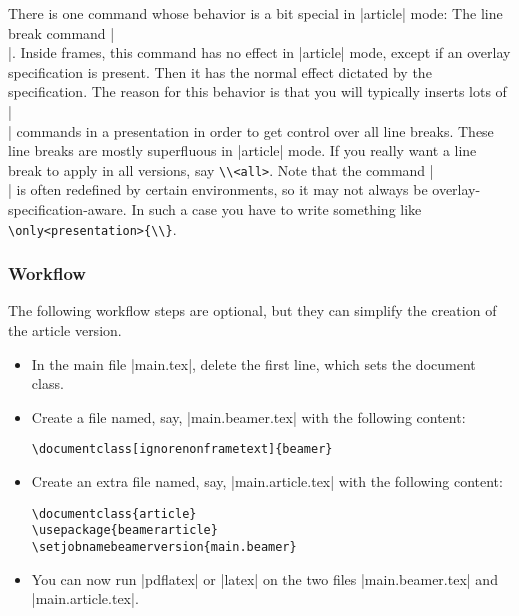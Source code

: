 There is one command whose behavior is a bit special in |article| mode: The line break command |\\|. Inside frames, this command has no effect in |article| mode, except if an overlay specification is present. Then it has the normal effect dictated by the specification. The reason for this behavior is that you will typically inserts lots of |\\| commands in a presentation in order to get control over all line breaks. These line breaks are mostly superfluous in |article| mode. If you really want a line break to apply in all versions, say \Verb|\\<all>|. Note that the command |\\| is often redefined by certain environments, so it may not always be overlay-specification-aware. In such a case you have to write something like \Verb|\only<presentation>{\\}|.

\subsubsection{Workflow}
\label{section-article-version-workflow}

The following workflow steps are optional, but they can simplify the creation of the article version.

\begin{itemize}
\item
  In the main file |main.tex|, delete the first line, which sets the document class.
\item
  Create a file named, say, |main.beamer.tex| with the following content:

\begin{verbatim}
\documentclass[ignorenonframetext]{beamer}

\end{verbatim}

\item
  Create an extra file named, say, |main.article.tex| with the following content:

\begin{verbatim}
\documentclass{article}
\usepackage{beamerarticle}
\setjobnamebeamerversion{main.beamer}

\end{verbatim}

\item
  You can now run |pdflatex| or |latex| on the two files |main.beamer.tex| and |main.article.tex|.
\end{itemize}

